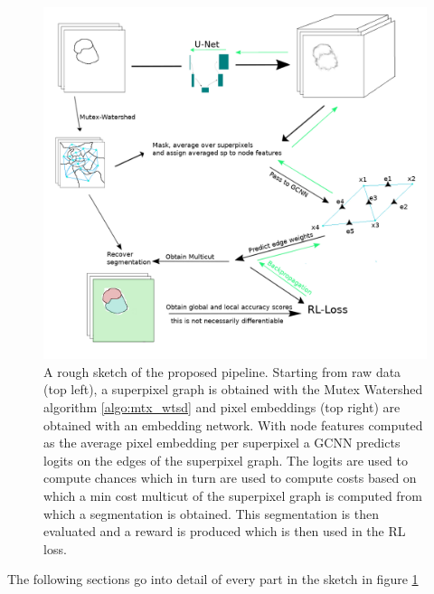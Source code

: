 \begin{figure}[ht!]
	\centering
	\includegraphics[width=1\textwidth]{figures/images/sketch_overall.png}
	\caption{A rough sketch of the proposed pipeline. Starting from raw data (top left), a superpixel graph is obtained with the Mutex Watershed algorithm \ref{algo:mtx_wtsd} and pixel embeddings (top right) are obtained with an embedding network. With node features computed as the average pixel embedding per superpixel a GCNN predicts logits on the edges of the superpixel graph. The logits are used to compute chances which in turn are used to compute costs based on which a min cost multicut of the superpixel graph is computed from which a segmentation is obtained. This segmentation is then evaluated and a reward is produced which is then used in the RL loss.}
	\label{overview}
\end{figure}


The following sections go into detail of every part in the sketch in figure \ref{overview}